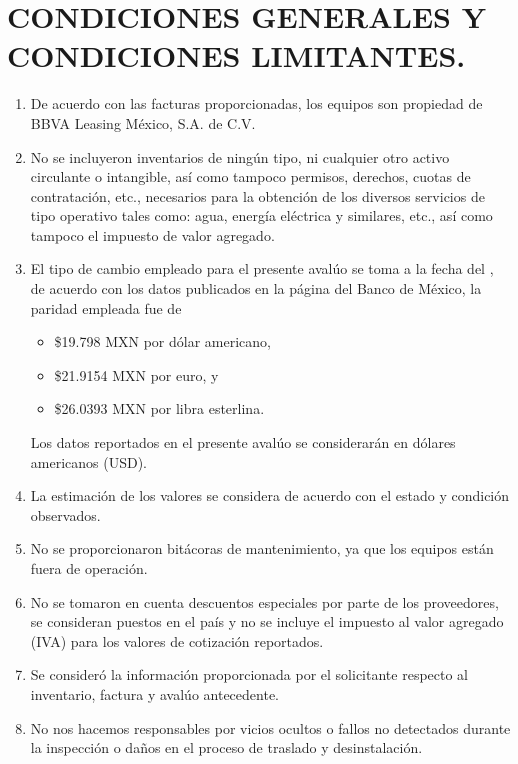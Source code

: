 \chapter{CONDICIONES GENERALES Y CONDICIONES LIMITANTES.} %

\begin{enumerate}
	\item De acuerdo con las facturas proporcionadas, los equipos son propiedad de BBVA Leasing México, S.A. de C.V.
	\item No se incluyeron inventarios de ningún tipo, ni cualquier otro activo circulante o intangible, así como tampoco permisos, derechos, cuotas de contratación, etc., necesarios para la obtención de los diversos servicios de tipo operativo tales como: agua, energía eléctrica y similares, etc., así como tampoco el impuesto de valor agregado.
	\item El tipo de cambio empleado para el presente avalúo se toma a la fecha del \fechaValores, de acuerdo con los datos publicados en la página del Banco de México, la paridad empleada fue de 
		\begin{itemize}
			\item \$19.798 MXN por dólar americano,
			\item \$21.9154 MXN por euro, y
			\item \$26.0393 MXN por libra esterlina.
		\end{itemize}
		Los datos reportados en el presente avalúo se considerarán en dólares americanos (USD).
	\item La estimación de los valores se considera de acuerdo con el estado y condición observados.
	\item No se proporcionaron bitácoras de mantenimiento, ya que los equipos están fuera de operación.
	\item No se tomaron en cuenta descuentos especiales por parte de los proveedores, se consideran puestos en el país y no se incluye el impuesto al valor agregado (IVA) para los valores de cotización reportados.
	\item Se consideró la información proporcionada por el solicitante respecto al inventario, factura y avalúo antecedente.
	\item No nos hacemos responsables por vicios ocultos o fallos no detectados durante la inspección o daños en el proceso de traslado y desinstalación.
\end{enumerate}

